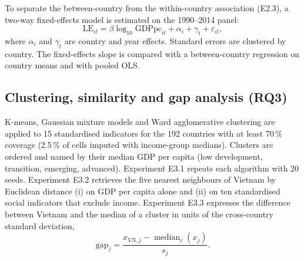 \documentclass[11pt,a4paper]{article}
\begin{document}
To separate the between-country from the within-country association (E2.3), a two-way fixed-effects model \cite{wooldridge} is estimated on the 1990--2014 panel:
\begin{equation}
\mathrm{LE}_{it} = \beta \log_{10}\mathrm{GDPpc}_{it} + \alpha_i + \gamma_t + \varepsilon_{it},
\end{equation}
where $\alpha_i$ and $\gamma_t$ are country and year effects. Standard errors are clustered by country. The fixed-effects slope is compared with a between-country regression on country means and with pooled OLS.

\subsection{Clustering, similarity and gap analysis (RQ3)}
K-means, Gaussian mixture models and Ward agglomerative clustering are applied to 15 standardised indicators for the 192 countries with at least 70\,\% coverage (2.5\,\% of cells imputed with income-group medians). Clusters are ordered and named by their median GDP per capita (low development, transition, emerging, advanced). Experiment E3.1 repeats each algorithm with 20 seeds. Experiment E3.2 retrieves the five nearest neighbours of Vietnam by Euclidean distance (i) on GDP per capita alone and (ii) on ten standardised social indicators that exclude income. Experiment E3.3 expresses the difference between Vietnam and the median of a cluster in units of the cross-country standard deviation,
\begin{equation}
\mathrm{gap}_j = \frac{x_{\mathrm{VN},j} - \operatorname{median}_{c}(x_j)}{s_j}.
\end{equation}
\end{document}
